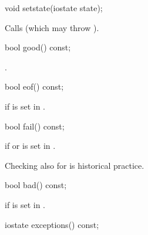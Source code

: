 %
\begin{itemdecl}
void setstate(iostate state);
\end{itemdecl}

\begin{itemdescr}
\pnum
\effects
Calls
(which may throw
).
\end{itemdescr}

%
\begin{itemdecl}
bool good() const;
\end{itemdecl}

\begin{itemdescr}
\pnum
\returns
{}.
\end{itemdescr}

%
\begin{itemdecl}
bool eof() const;
\end{itemdecl}

\begin{itemdescr}
\pnum
\returns
{}
if
is set in
.
\end{itemdescr}

%
\begin{itemdecl}
bool fail() const;
\end{itemdecl}

\begin{itemdescr}
\pnum
\returns
{}
if
or
is set in
.
\begin{footnote}
Checking
also for
is historical practice.
\end{footnote}
\end{itemdescr}

%
\begin{itemdecl}
bool bad() const;
\end{itemdecl}

\begin{itemdescr}
\pnum
\returns
{}
if
is set in
.
\end{itemdescr}

%
\begin{itemdecl}
iostate exceptions() const;
\end{itemdecl}

